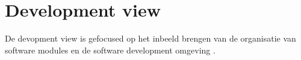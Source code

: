 \section{Development view}
De devopment view is gefocused op het inbeeld brengen van de organisatie van software modules en de software development omgeving \parencite{4+1ViewModelPaper}.



